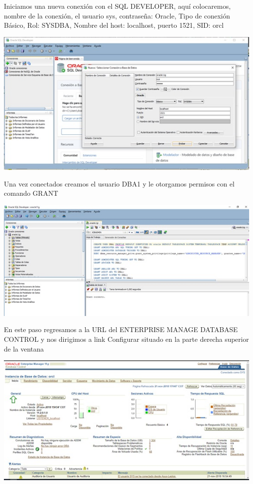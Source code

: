 \begin{flushleft}
Iniciamos una nueva conexión con el SQL DEVELOPER, aquí colocaremos, nombre de la conexión, el usuario sys, contraseña: Oracle, Tipo de conexión Básico, Rol: SYSDBA, Nombre del host: localhost, puerto 1521, SID: orcl\\
\begin{center}
\includegraphics{images/image-18}\\
\end{center}
Una vez conectados creamos el usuario DBA1 y le otorgamos permisos con el comando GRANT\\
\begin{center}
\includegraphics{images/image-19}\\
\end{center}
En este paso regresamos a la URL del ENTERPRISE MANAGE DATABASE CONTROL y nos dirigimos a link Configurar situado en la parte derecha superior de la ventana\\
\begin{center}
\includegraphics{images/image-20}\\

\end{center}
\end{flushleft}
